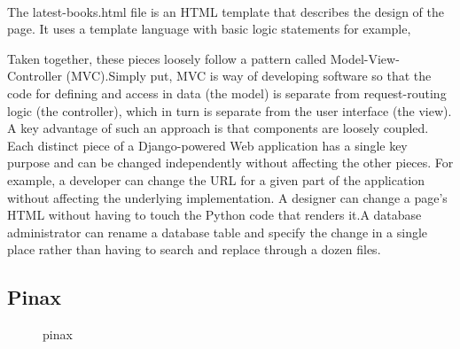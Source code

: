 \documentclass[12pt,a4paper,class,twoside,openany]{report}
\begin{document}
\paragraph*{\hspace{.9 cm} } The latest-books.html file is an HTML template that describes the design of the page.
It uses a template language with basic logic statements for example, {%
Taken together, these pieces loosely follow a pattern called Model-View-Controller (MVC).Simply put, MVC is way of developing software so that the code for defining and access in data (the model) is separate from request-routing logic (the controller), which in turn is separate from the user interface (the view).
 A key advantage of such an approach is that components are loosely coupled. Each distinct piece of a Django-powered Web application has a single key purpose and can be changed independently without affecting the other pieces. For example, a developer can change the URL for a given part of the application without affecting the underlying implementation. A designer can change a page's HTML without having to touch the Python code that renders it.A database administrator can rename a database table and specify the change in a single place rather than having to search and replace through a dozen files.
\subsection{Pinax}
\begin{figure}
\begin{center}
\caption{pinax}
\label{fg:3-9}
\end{center}
\end{figure}
}
\end{document}
